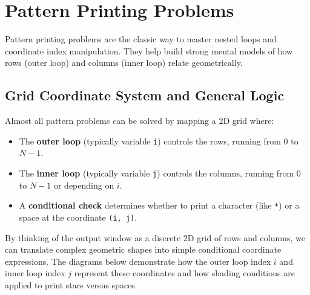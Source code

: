 \documentclass[12pt,a4paper,oneside]{book}
\begin{document}
\section{Pattern Printing Problems}

Pattern printing problems are the classic way to master nested loops and coordinate index manipulation. They help build strong mental models of how rows (outer loop) and columns (inner loop) relate geometrically. 

\subsection{Grid Coordinate System and General Logic}
Almost all pattern problems can be solved by mapping a 2D grid where:
\begin{itemize}
    \item The \textbf{outer loop} (typically variable \texttt{i}) controls the rows, running from $0$ to $N-1$.
    \item The \textbf{inner loop} (typically variable \texttt{j}) controls the columns, running from $0$ to $N-1$ or depending on $i$.
    \item A \textbf{conditional check} determines whether to print a character (like \texttt{*}) or a space at the coordinate \texttt{(i, j)}.
\end{itemize}

By thinking of the output window as a discrete 2D grid of rows and columns, we can translate complex geometric shapes into simple conditional coordinate expressions. The diagrams below demonstrate how the outer loop index $i$ and inner loop index $j$ represent these coordinates and how shading conditions are applied to print stars versus spaces.
\end{document}

